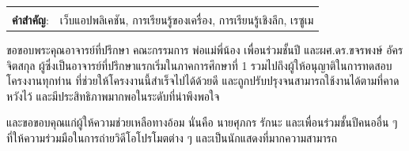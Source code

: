 \documentclass[12pt,oneside,openright,a4paper]{cpe-thai-project}
\begin{document}
\begin{flushleft}
    \begin{tabular*}{\textwidth}{@{}lp{}}
        & \\

        \textbf{คำสำคัญ}: & เว็บแอปพลิเคชัน, การเรียนรู้ของเครื่อง, การเรียนรู้เชิงลึก, เรซูเม
    \end{tabular*}
\end{flushleft}
\endabstract


\preface
ขอขอบพระคุณอาจารย์ที่ปรึกษา คณะกรรมการ พ่อแม่พี่น้อง เพื่อนร่วมชั้นปี และผศ.ดร.ขจรพงษ์ อัครจิตสกุล ผู้ซึ่งเป็นอาจารย์ที่ปรึกษาแรกเริ่มในภาคการศึกษาที่ 1
รวมไปถึงผู้ให้อนุญาติในการทดสอบโครงงานทุกท่าน
ที่ช่วยให้โครงงานนี้สำเร็จไปได้ด้วยดี และถูกปรับปรุงจนสามารถใช้งานได้ตามที่คาดหวังไว้ และมีประสิทธิภาพมากพอในระดับที่น่าพึงพอใจ

และขอขอบคุณแก่ผู้ให้ความช่วยเหลือทางอ้อม นั่นคือ นายศุภกร รักนะ และเพื่อนร่วมชั้นปีคนออื่น ๆ ที่ให้ความร่วมมือในการถ่ายวิดีโอโปรโมตต่าง ๆ และเป็นนักแสดงที่มากความสามารถ

\tableofcontents
\listoftables
\listoffigures
\end{document}
